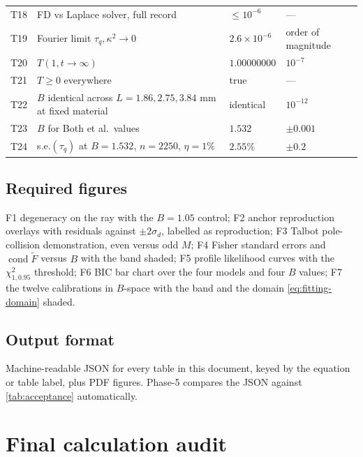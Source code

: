 \documentclass[11pt,a4paper]{article}
\theoremstyle{definition}
\newcommand{\tq}{\tau_{q}}
\newcommand{\kk}{\kappa^{2}}
\newcommand{\Bnum}{B}
\begin{document}
\begin{table}[H]
\begin{tabularx}{\textwidth}{@{}rXll@{}}
T18 & FD vs Laplace solver, full record & $\leq10^{-6}$ & --- \\
T19 & Fourier limit $\tq,\kk\to0$ & $2.6\times10^{-6}$ & order of
  magnitude \\
T20 & $T(1,t\to\infty)$ & $1.00000000$ & $10^{-7}$ \\
T21 & $T\geq0$ everywhere & true & --- \\
T22 & $\Bnum$ identical across $L=1.86,2.75,3.84$ mm at fixed material &
  identical & $10^{-12}$ \\
T23 & $\Bnum$ for Both et al.\ values & $1.532$ & $\pm0.001$ \\
T24 & s.e.$(\tq)$ at $\Bnum=1.532$, $n=2250$, $\eta=1\%$ & $2.55\%$ &
  $\pm0.2$ \\
\bottomrule
\end{tabularx}
\end{table}

\subsection{Required figures}

F1 degeneracy on the ray with the $\Bnum=1.05$ control;
F2 anchor reproduction overlays with residuals against $\pm2\sigma_{d}$,
labelled as reproduction;
F3 Talbot pole-collision demonstration, even versus odd $M$;
F4 Fisher standard errors and $\operatorname{cond}\tilde F$ versus $\Bnum$
with the band shaded;
F5 profile likelihood curves with the $\chi^{2}_{1,0.95}$ threshold;
F6 BIC bar chart over the four models and four $\Bnum$ values;
F7 the twelve calibrations in $\Bnum$-space with the band and the domain
\eqref{eq:fitting-domain} shaded.

\subsection{Output format}

Machine-readable JSON for every table in this document, keyed by the equation
or table label, plus PDF figures. Phase-5 compares the JSON against
\cref{tab:acceptance} automatically.

\section{Final calculation audit}
\label{sec:audit}
\end{document}
